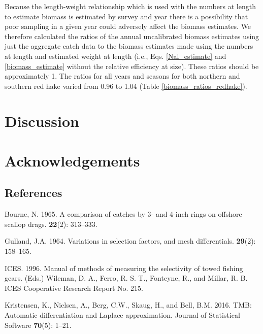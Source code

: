 \documentclass[]{article}
\begin{document}
Because the length-weight relationship which is used with the numbers at
length to estimate biomass is estimated by survey and year there is a
possibility that poor sampling in a given year could adversely affect
the biomass estimates. We therefore calculated the ratios of the annual
uncalibrated biomass estimates using just the aggregate catch data to
the biomass estimates made using the numbers at length and estimated
weight at length (i.e., Eqs. \ref{Nal_estimate} and
\ref{biomass_estimate} without the relative efficiency at size). These
ratios should be approximately 1. The ratios for all years and seasons
for both northern and southern red hake varied from 0.96 to 1.04 (Table
\ref{biomass_ratios_redhake}).

\hypertarget{discussion}{%
\section{Discussion}\label{discussion}}

\hypertarget{acknowledgements}{%
\section*{Acknowledgements}\label{acknowledgements}}

\pagebreak

\hypertarget{references}{%
\subsection*{References}\label{references}}

\hypertarget{refs}{}
\leavevmode\hypertarget{ref-bourne65}{}%
Bourne, N. 1965. A comparison of catches by 3- and 4-inch rings on
offshore scallop drags. \textbf{22}(2): 313--333.

\leavevmode\hypertarget{ref-gulland64}{}%
Gulland, J.A. 1964. Variations in selection factors, and mesh
differentials. \textbf{29}(2): 158--165.

\leavevmode\hypertarget{ref-ices96}{}%
ICES. 1996. Manual of methods of measuring the selectivity of towed
fishing gears. (Eds.) Wileman, D. A., Ferro, R. S. T., Fonteyne, R., and
Millar, R. B. ICES Cooperative Research Report No. 215.

\leavevmode\hypertarget{ref-kristensenetal16}{}%
Kristensen, K., Nielsen, A., Berg, C.W., Skaug, H., and Bell, B.M. 2016.
TMB: Automatic differentiation and Laplace approximation. Journal of
Statistical Software \textbf{70}(5): 1--21.
\end{document}
